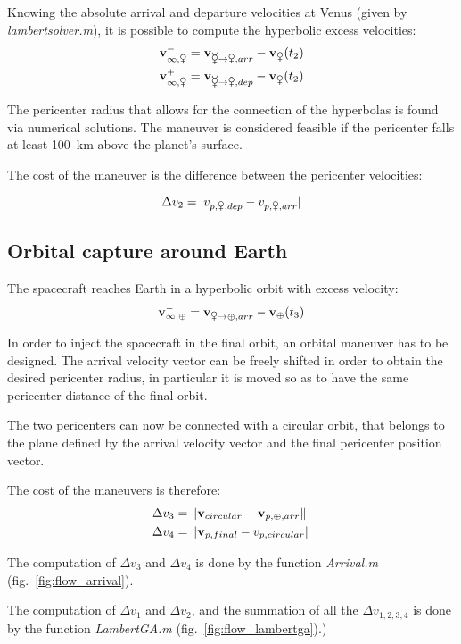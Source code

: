 Knowing the absolute arrival and departure velocities at Venus (given by {\it lambertsolver.m}),
it is possible to compute the hyperbolic excess velocities:
\begin{align*}
\mathbf v_{\infty,\venus}^-&=\mathbf v_{\mercury\rightarrow\venus,arr}-\mathbf v_{\venus}(t_2) \\
\mathbf v_{\infty,\venus}^+&=\mathbf v_{\mercury\rightarrow\venus,dep}-\mathbf v_{\venus}(t_2)
\end{align*}

The pericenter radius that allows for the connection of the hyperbolas is found via numerical solutions.
The maneuver is considered feasible if the pericenter falls at least \SI{100}{km} above the planet's surface.

The cost of the maneuver is the difference between the pericenter velocities:

$$\Delta v_2 = \abs{v_{p,\venus,dep} - v_{p,\venus,arr}}$$

\subsection{Orbital capture around Earth}

The spacecraft reaches Earth in a hyperbolic orbit with excess velocity:
$$\mathbf v_{\infty,\oplus}^-=\mathbf v_{\venus\rightarrow\oplus,arr}-\mathbf v_{\oplus}(t_3)$$

In order to inject the spacecraft in the final orbit, an orbital maneuver has to be designed.
The arrival velocity vector can be freely shifted in order to obtain the desired pericenter radius,
in particular it is moved so as to have the same pericenter distance of the final orbit.

The two pericenters can now be connected with a circular orbit,
that belongs to the plane defined by the arrival velocity vector and the final pericenter position vector.

The cost of the maneuvers is therefore:
\begin{align*}
\Delta v_3 &= \lVert\mathbf v_{circular} - \mathbf v_{p,\oplus,arr}\rVert \\
\Delta v_4 &= \lVert\mathbf v_{p,final} - v_{p,circular}\rVert
\end{align*}

The computation of $\Delta v_3$ and $\Delta v_4$ is done by the function {\it Arrival.m} (fig.~\ref{fig:flow_arrival}).


The computation of $\Delta v_1$ and $\Delta v_2$, and the summation of all the $\Delta v_{1,2,3,4}$ is done by the function {\it LambertGA.m} (fig.~\ref{fig:flow_lambertga}).)

